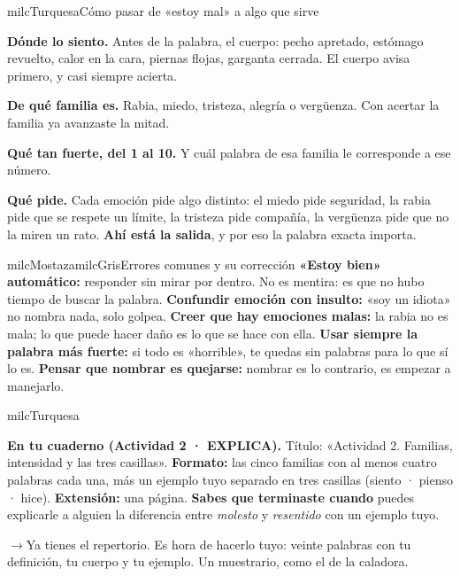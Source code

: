 \documentclass[11pt,letterpaper]{article}
\newcommand{\puente}[1]{%
  \begin{puentebox}%
    \textcolor{milcGradeDark}{$\rightarrow$}\hspace{2mm}#1%
  \end{puentebox}%
}
\begin{document}
\begin{drawbox}{milcTurquesa}{Cómo pasar de «estoy mal» a algo que sirve}
\begin{pasoslista}
\item \textbf{Dónde lo siento.} Antes de la palabra, el cuerpo: pecho apretado, estómago revuelto, calor en la cara, piernas flojas, garganta cerrada. El cuerpo avisa primero, y casi siempre acierta.
\item \textbf{De qué familia es.} Rabia, miedo, tristeza, alegría o vergüenza. Con acertar la familia ya avanzaste la mitad.
\item \textbf{Qué tan fuerte, del 1 al 10.} Y cuál palabra de esa familia le corresponde a ese número.
\item \textbf{Qué pide.} Cada emoción pide algo distinto: el miedo pide seguridad, la rabia pide que se respete un límite, la tristeza pide compañía, la vergüenza pide que no la miren un rato. \textbf{Ahí está la salida}, y por eso la palabra exacta importa.
\end{pasoslista}
\end{drawbox}

\begin{softbox}{milcMostaza}{milcGris}{Errores comunes y su corrección}
\textbf{«Estoy bien» automático:} responder sin mirar por dentro. No es mentira: es que no hubo tiempo de buscar la palabra. \textbf{Confundir emoción con insulto:} «soy un idiota» no nombra nada, solo golpea. \textbf{Creer que hay emociones malas:} la rabia no es mala; lo que puede hacer daño es lo que se hace con ella. \textbf{Usar siempre la palabra más fuerte:} si todo es «horrible», te quedas sin palabras para lo que sí lo es. \textbf{Pensar que nombrar es quejarse:} nombrar es lo contrario, es empezar a manejarlo.
\end{softbox}

\begin{infoband}{milcTurquesa}


\textbf{En tu cuaderno (Actividad 2 · EXPLICA).} Título: «Actividad 2. Familias, intensidad y las tres casillas». \textbf{Formato:} las cinco familias con al menos cuatro palabras cada una, más un ejemplo tuyo separado en tres casillas (siento · pienso · hice). \textbf{Extensión:} una página. \textbf{Sabes que terminaste cuando} puedes explicarle a alguien la diferencia entre \emph{molesto} y \emph{resentido} con un ejemplo tuyo.
\end{infoband}

\puente{Ya tienes el repertorio. Es hora de hacerlo tuyo: veinte palabras con tu definición, tu cuerpo y tu ejemplo. Un muestrario, como el de la caladora.}
\end{document}
